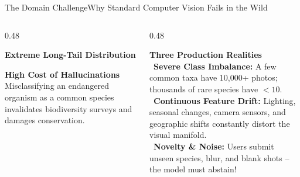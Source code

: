\documentclass[aspectratio=169,10pt]{beamer}
\begin{document}
\begin{frame}{The Domain Challenge}{Why Standard Computer Vision Fails in the Wild}
    \begin{columns}[T]
        \begin{column}{0.48\textwidth}
            \centering
            \begin{tcolorbox}[enhanced, colback=white, colframe=SlateMid!30, boxrule=0.5pt, arc=3pt, left=4pt, right=4pt, top=3pt, bottom=3pt]
                \textbf{\scriptsize Extreme Long-Tail Distribution}\\[2pt]
            \end{tcolorbox}
            \vspace{0.15cm}
            \begin{rosecard}
                \textbf{\color{RoseAccent} High Cost of Hallucinations}\\[1pt]
                Misclassifying an endangered organism as a common species invalidates biodiversity surveys and damages conservation.
            \end{rosecard}
        \end{column}
        \begin{column}{0.48\textwidth}
            \begin{card}
                \textbf{\color{BlueAccent} Three Production Realities}\\[3pt]
                \textbullet\ \textbf{Severe Class Imbalance:} A few common taxa have 10,000+ photos; thousands of rare species have $<10$.\\[4pt]
                \textbullet\ \textbf{Continuous Feature Drift:} Lighting, seasonal changes, camera sensors, and geographic shifts constantly distort the visual manifold.\\[4pt]
                \textbullet\ \textbf{Novelty \& Noise:} Users submit unseen species, blur, and blank shots -- the model must abstain!
            \end{card}
        \end{column}
    \end{columns}
\end{frame}
\end{document}
